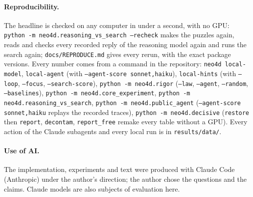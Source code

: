 \documentclass[10pt]{article}
\begin{document}
\paragraph{Reproducibility.} \sloppy The headline is checked on any computer in under a second, with no GPU:
\texttt{python -m neo4d.reasoning\_vs\_search --recheck} makes the puzzles again, reads and checks every recorded reply
of the reasoning model again and runs the search again; \texttt{docs/REPRODUCE.md} gives every rerun, with the exact
package versions. Every number comes from a command in the repository: \texttt{neo4d local-model},
\texttt{local-agent} (with \texttt{--agent-score sonnet,haiku}), \texttt{local-hints} (with \texttt{--loop},
\texttt{--focus}, \texttt{--search-score}), \texttt{python -m neo4d.rigor} (\texttt{--law}, \texttt{--agent},
\texttt{--random}, \texttt{--baselines}), \texttt{python -m neo4d.core\_experiment},
\texttt{python -m neo4d.reasoning\_vs\_search}, \texttt{python -m neo4d.public\_agent} (\texttt{--agent-score
sonnet,haiku} replays the recorded traces), \texttt{python -m neo4d.decisive} (\texttt{restore} then \texttt{report},
\texttt{decontam}, \texttt{report\_free} remake every table without a GPU). Every action of the Claude subagents and every local run is in
\texttt{results/data/}.

\paragraph{Use of AI.} The implementation, experiments and text were produced with Claude Code (Anthropic) under the
author's direction; the author chose the questions and the claims. Claude models are also subjects of evaluation here.
\end{document}
